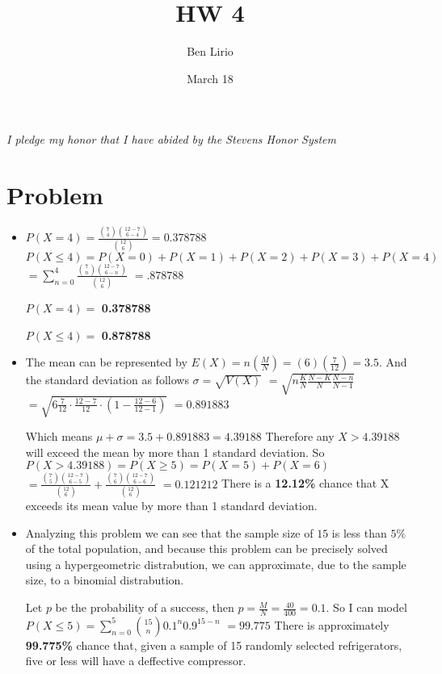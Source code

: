 \documentclass[12pt, letterpaper]{article}
\title{HW 4}
\author{Ben Lirio}
\date{March 18}
\begin{document}
\maketitle
\textit{I pledge my honor that I have abided by the Stevens Honor System}
\section{Problem}
\begin{itemize}
\item
$P(X = 4) = \frac{\binom{7}{4}\binom{12-7}{6-4}}{\binom{12}{6}} = 0.378788$
$P(X \le 4) = P(X = 0) + P(X = 1) + P(X = 2) + P(X = 3) + P(X = 4)$
$ = \sum_{n=0}^{4} \frac{\binom{7}{n}\binom{12-7}{6-n}}{\binom{12}{6}}$
$ = .878788 $

$P(X = 4) = $ \textbf{0.378788}

$P(X \le 4) = $ \textbf{0.878788}

\item The mean can be represented by 
$E(X) = n(\frac{M}{N}) = (6)(\frac{7}{12}) = 3.5 $.
And the standard deviation as follows 
$\sigma = \sqrt{V(X)}$
$ = \sqrt{n\frac{K}{N} \frac{N-K}{N} \frac{N-n}{N-1}}$
$ = \sqrt{6 \frac{7}{12} \cdot \frac{12-7}{12} \cdot (1 - \frac{12-6}{12-1})}$
$ = 0.891883$

Which means $\mu + \sigma = 3.5 + 0.891883 = 4.39188$
Therefore any $X > 4.39188$ will exceed the mean by more than 1 standard deviation. So
$P(X > 4.39188) = P(X \ge 5) = P(X = 5) + P(X = 6)$ 
$ = \frac{\binom{7}{5} \binom{12-7}{6-5}}{\binom{12}{6}} + \frac{\binom{7}{6} \binom{12-7}{6-6}}{\binom{12}{6}}$
$ = 0.121212 $
There is a \textbf{12.12\%} chance that X exceeds its mean value by more than 1 standard deviation.


\item Analyzing this problem we can see that the sample size of $15$ is less than $5\%$ of the total population, and because this problem can be precisely solved using a hypergeometric distrabution, we can approximate, due to the sample size, to a binomial distrabution.

Let $p$ be the probability of a success, then $p = \frac{M}{N} = \frac{40}{400} = 0.1$. So I can model
$P(X \le 5) = \sum_{n = 0}^{5} \binom{15}{n}0.1^{n}0.9^{15-n} $
$ = 99.775 $
There is approximately \textbf{99.775\%} chance that, given a sample of 15 randomly selected refrigerators, five or less will have a deffective compressor.
\end{itemize}
\end{document}
